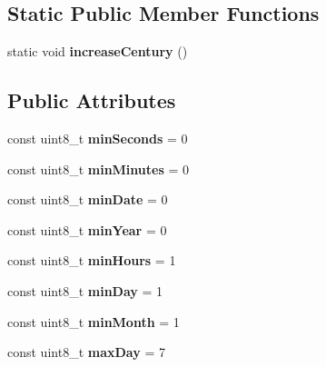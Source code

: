 \subsection*{Static Public Member Functions}
\begin{DoxyCompactItemize}
\item 
\mbox{\label{classtime_a35f54f331571b5bc8135f586045d753e}} 
static void {\bfseries increase\+Century} ()
\end{DoxyCompactItemize}
\subsection*{Public Attributes}
\begin{DoxyCompactItemize}
\item 
\mbox{\label{classtime_ab2b254fe96fb3bafed7da738bda3c6c6}} 
const uint8\+\_\+t {\bfseries min\+Seconds} = 0
\item 
\mbox{\label{classtime_a23400f37b2c7f65ab8cc94059ec700f4}} 
const uint8\+\_\+t {\bfseries min\+Minutes} = 0
\item 
\mbox{\label{classtime_a92ca207c7e5ead60298ab7f3e1f9e002}} 
const uint8\+\_\+t {\bfseries min\+Date} = 0
\item 
\mbox{\label{classtime_a1697927f878a6ff5b88a385ff1d13e32}} 
const uint8\+\_\+t {\bfseries min\+Year} = 0
\item 
\mbox{\label{classtime_af5a330549db1f4a8f8576f0e2fbb8a49}} 
const uint8\+\_\+t {\bfseries min\+Hours} = 1
\item 
\mbox{\label{classtime_af775686641b3f5a791e490c9e75a90d5}} 
const uint8\+\_\+t {\bfseries min\+Day} = 1
\item 
\mbox{\label{classtime_a1a7dcc6e6ec193ec260b801598716d49}} 
const uint8\+\_\+t {\bfseries min\+Month} = 1
\item 
\mbox{\label{classtime_ac2ce42c35a6dffe688f04edb3f02bba2}} 
const uint8\+\_\+t {\bfseries max\+Day} = 7
\item 
\mbox{\label{classtime_a6bdfb853fd818812388132c32d13d58f}} 

\end{DoxyCompactItemize}
